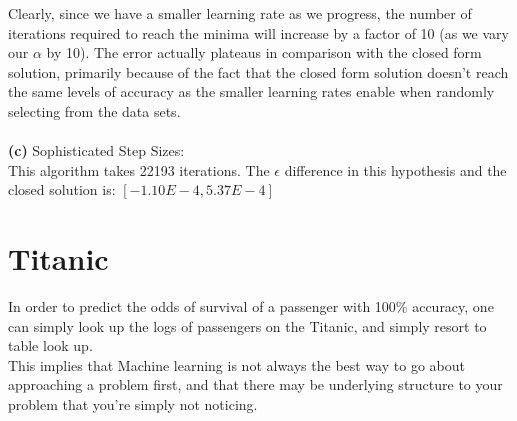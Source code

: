 \documentclass[11pt]{article}
\begin{document}
Clearly, since we have a smaller learning rate as we progress, the number of iterations required to reach the minima will increase by a factor of 10 (as we vary our $\alpha$ by 10). The error actually plateaus in comparison with the closed form solution, primarily because of the fact that the closed form solution doesn't reach the same levels of accuracy as the smaller learning rates enable when randomly selecting from the data sets. \\
\\
\textbf{(c)} Sophisticated Step Sizes:\\
This algorithm takes 22193 iterations. The $\epsilon$ difference in this hypothesis and the closed solution is: $[-1.10E-4, 5.37E-4]$

\section*{Titanic}
In order to predict the odds of survival of a passenger with 100\% accuracy, one can simply look up the logs of passengers on the Titanic, and simply resort to table look up.\\

This implies that Machine learning is not always the best way to go about approaching a problem first, and that there may be underlying structure to your problem that you're simply not noticing.
\end{document}
